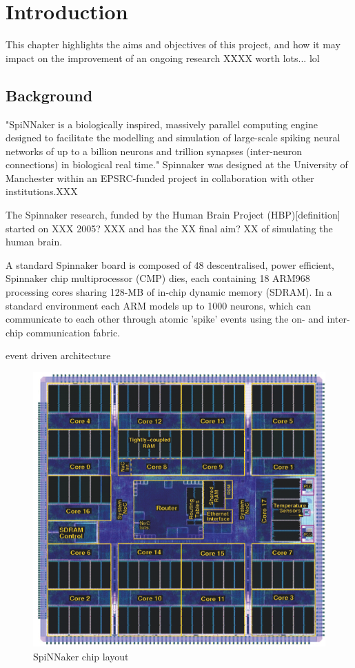 \chapter{Introduction}
\label{cha:intro}

This chapter highlights the aims and objectives of this project, and how it may impact on the improvement of an ongoing research XXXX worth lots... lol

\section{Background}
\label{sec:background}

"SpiNNaker is a biologically inspired, massively parallel computing engine designed to facilitate the modelling and simulation of large-scale spiking neural networks of up to a billion neurons and trillion synapses (inter-neuron connections) in biological real time."\cite{painkras} Spinnaker was designed at the University of Manchester within an EPSRC-funded project in collaboration with other institutions.XXX

The Spinnaker research, funded by the Human Brain Project (HBP)[definition] started on XXX 2005? XXX and has the XX final aim? XX of simulating the human brain.

A standard Spinnaker board is composed of 48 descentralised, power efficient, Spinnaker chip multiprocessor (CMP) dies, each containing 18 ARM968 processing cores sharing 128-MB of in-chip dynamic memory (SDRAM). In a standard environment each ARM models up to 1000 neurons, which can communicate to each other through atomic 'spike' events using the on- and inter-chip communication fabric.\cite{datasheet}

event driven architecture

\begin{figure}
\begin{center}
	\includegraphics[width=1\textwidth, natwidth=608, natheight=571]{images/chip.png}
\end{center}
\caption{SpiNNaker chip layout}
\end{figure}

